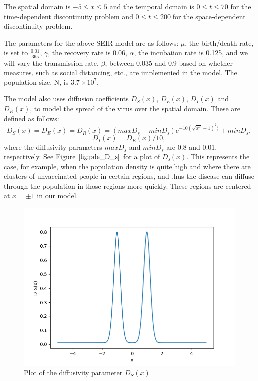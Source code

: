 \documentclass{article}
\begin{document}
The spatial domain is $-5 \leq x \leq 5$ and the temporal domain is $0 \leq t \leq 70$ for the time-dependent discontinuity problem and $0 \leq t \leq 200$ for the space-dependent discontinuity problem.

The parameters for the above SEIR model are as follows: $\mu$, the birth/death rate, is set to $\frac{0.01}{365}$, $\gamma$, the recovery rate is 0.06, $\alpha$, the incubation rate is 0.125, and we will vary the transmission rate, $\beta$, between 0.035 and 0.9 based on whether measures, such as social distancing, etc., are implemented in the model. The population size, N, is $3.7 \times 10^{7}$.

The model also uses diffusion coefficients $D_S(x)$, $D_E(x)$, $D_I(x)$ and $D_R(x)$, to model the spread of the virus over the spatial domain. These are defined as follows:
\begin{equation}
D_S(x) = D_E(x) = D_R(x) = (maxD_s - minD_s)e^{-10(\sqrt{x^{2}} - 1)^2)} + minD_s,
\end{equation} 
\begin{equation}
D_I(x) = D_E(x)/10,
\end{equation}
where the diffusivity parameters $maxD_s$ and $minD_s$ are 0.8 and 0.01, respectively. See Figure $\ref{fig:pde_D_s}$ for a plot of $D_s(x)$. This represents the case, for example, when the population density is quite high and where there are clusters of unvaccinated people in certain regions, and thus the disease can diffuse through the population in those regions more quickly. These regions are centered at $x= \pm 1$ in our model.

\begin{figure}[H]
\centering
\includegraphics[width=0.7\linewidth]{./figures/pde_D_s}
\caption{Plot of the diffusivity parameter $D_S(x)$}
\label{fig:pde_D_s}
\end{figure}
\end{document}
